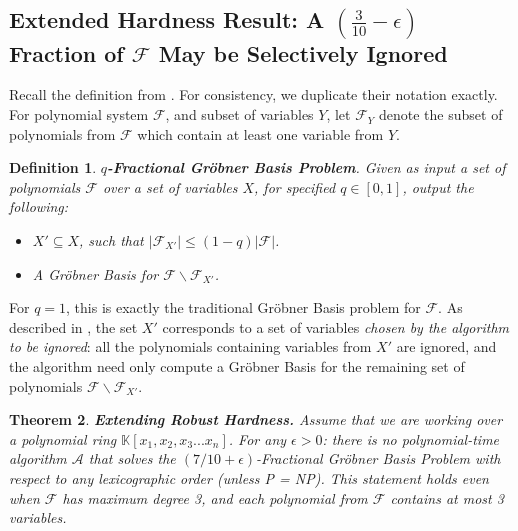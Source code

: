 \documentclass{article}
\newtheorem{theorem}{Theorem}[]
\newtheorem{definition}[theorem]{Definition}
\begin{document}
\subsection{Extended Hardness Result: A $(\frac{3}{10}-\epsilon)$ Fraction of $\mathcal{F}$ May be Selectively Ignored} \label{not2sec}

Recall the definition from \citep{RS}. For consistency, we duplicate their notation exactly. For polynomial system $\mathcal{F}$, and subset of variables $Y$, let $\mathcal{F}_Y$ denote the subset of polynomials from $\mathcal{F}$ which contain at least one variable from $Y$.

\begin{definition}
\textbf{$q$-Fractional Gr\"{o}bner Basis Problem}. Given as input a set of polynomials $\mathcal{F}$ over a set of variables $X$, for specified $q\in [0,1]$, output the following:
\begin{itemize}
\item $X'\subseteq X$, such that $|\mathcal{F}_{X'}|\leq (1-q)|\mathcal{F}|$.
\item A Gr\"{o}bner Basis for $\mathcal{F}\backslash \mathcal{F}_{X'}$.
\end{itemize}
\end{definition}

\noindent For $q=1$, this is exactly the traditional Gr\"{o}bner Basis problem for $\mathcal{F}$. As described in \citep {RS}, the set $X'$ corresponds to a set of variables \textit{chosen by the algorithm to be ignored}: all the polynomials containing variables from $X'$ are ignored, and the algorithm need only compute a Gr\"{o}bner Basis for the remaining set of polynomials $\mathcal{F}\backslash \mathcal{F}_{X'}$.

\begin{theorem} \textbf{Extending Robust Hardness.} \label{extfrachard}
Assume that we are working over a polynomial ring $\mathbb{K}[x_1,x_2,x_3...x_n]$. For any $\epsilon>0$: there is no polynomial-time algorithm $\mathcal{A}$ that solves the $(7/10+\epsilon)$-Fractional Gr\"{o}bner Basis Problem with respect to any lexicographic order (unless P = NP). This statement holds even when $\mathcal{F}$ has maximum degree 3, and each polynomial from $\mathcal{F}$ contains at most 3 variables.
\end{theorem}
\end{document}
